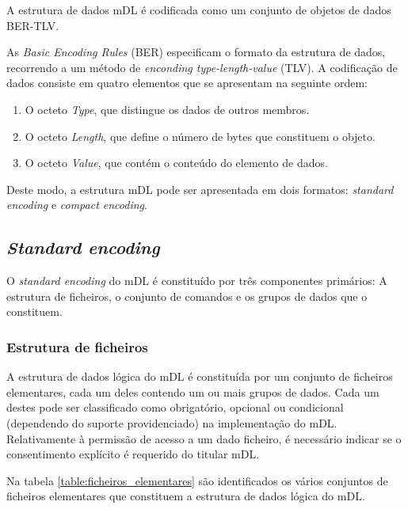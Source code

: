A estrutura de dados mDL é codificada como um conjunto de objetos de dados BER-TLV. 

As \textit{Basic Encoding Rules} (BER) especificam o formato da estrutura de dados, recorrendo a um método de \textit{enconding type-length-value} (TLV). A codificação de dados consiste em quatro elementos que se apresentam na seguinte ordem:

\begin{enumerate}
    \item O octeto \textit{Type}, que distingue os dados de outros membros.
    \item O octeto \textit{Length}, que define o número de bytes que constituem o objeto.
    \item O octeto \textit{Value}, que contém o conteúdo do elemento de dados.
\end{enumerate}

Deste modo, a estrutura mDL pode ser apresentada em dois formatos: \textit{standard encoding} e \textit{compact encoding}.


\subsection{\textit{Standard encoding}}

O \textit{standard encoding} do mDL é constituído por três componentes primários: A estrutura de ficheiros, o conjunto de comandos e os grupos de dados que o constituem.

\subsubsection{Estrutura de ficheiros}

A estrutura de dados lógica do mDL é constituída por um conjunto de ficheiros elementares, cada um deles contendo um ou mais grupos de dados. Cada um destes pode ser classificado como obrigatório, opcional ou condicional (dependendo do suporte providenciado) na implementação do mDL. Relativamente à permissão de acesso a um dado ficheiro, é necessário indicar se o consentimento explícito é requerido do titular mDL.

Na tabela \ref{table:ficheiros_elementares} são identificados os vários conjuntos de ficheiros elementares que constituem a estrutura de dados lógica do mDL.

